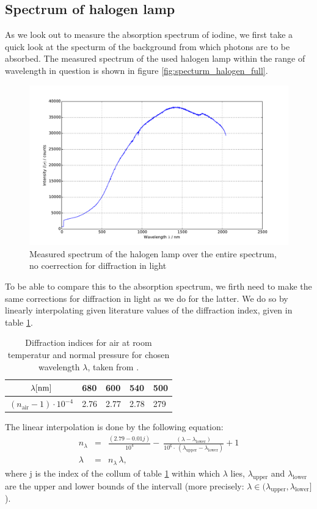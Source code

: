 \subsection{Spectrum of halogen lamp}
As we look out to measure the absorption spectrum of iodine, we first take a quick look at 
the specturm of the background from which photons are to be absorbed. The measured spectrum 
of the used halogen lamp within the range of wavelength in question is shown in figure 
\ref{fig:specturm_halogen_full}.
\begin{figure}
\centering
\includegraphics[width=\pltw]{analysis/figures/halogen_02.pdf}
\caption{Measured spectrum of the halogen lamp over the entire spectrum, no coerrection for 
diffraction in light}
\label{fig:spectrum_halogen_full}
\end{figure}
To be able to compare this to the absorption spectrum, we firth need to make the same 
corrections for diffraction in light as we do for the latter. We do so by linearly 
interpolating given literature values of the diffraction index, given in table 
\ref{tab:diff_air}.

\begin{table}[h]
\centering
\begin{tabular}{| c |l|l|l|l|}
\hline
$\lambda [\mathrm{nm}]$              & 680  & 600  & 540  & 500 \\ \hline
$(n_\mathrm{air} - 1) \cdot 10^{-4}$ & 2.76 & 2.77 & 2.78 & 279 \\ \hline
\end{tabular}
\caption{Diffraction indices for air at room temperatur and normal pressure for 
chosen wavelength $\lambda$, taken from \cite{}.}
\label{tab:diff_air}
\end{table}

The linear interpolation is done by the following equation:
\begin{eqnarray}
    n_\lambda &=& \frac{(2.79 - 0.01 j)}{10 ^{4}} - \
    \frac{(\lambda - \lambda_\mathrm{lower})} {10^{6} \cdot \
(\lambda_\mathrm{upper} - \lambda_\mathrm{lower})} + 1 \\
    \lambda &=& n_\lambda \, \lambda,
    \label{eqn:lin_interpol}
\end{eqnarray}
where j is the index of the collum of table \ref{tab:diff_air} within which $\lambda$ lies, 
$\lambda_\mathrm{upper}$ and $\lambda_\mathrm{lower}$ are the upper and lower bounds of the 
intervall (more precisely: $\lambda \in (\lambda_\mathrm{upper}, \lambda_\mathrm{lower}]$ ). 

